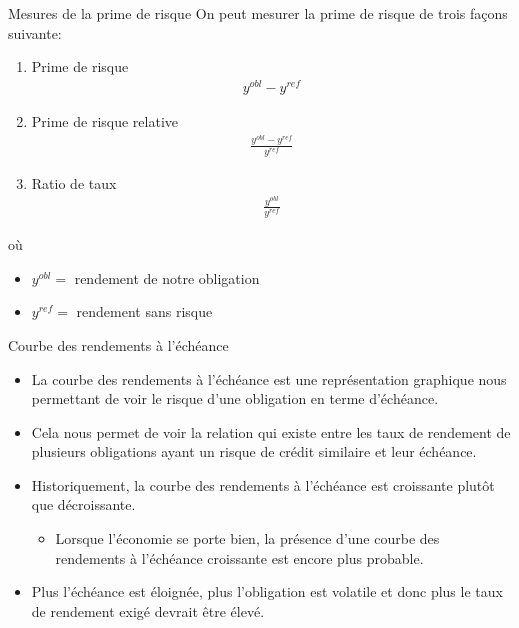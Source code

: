 \documentclass{beamer}
\begin{document}
\begin{frame}{Mesures de la prime de risque}
On peut mesurer la prime de risque de trois façons suivante:
\begin{enumerate}
\item Prime de risque 
\begin{align*}
y^{obl}-y^{ref}
\end{align*}
\item Prime de risque relative
\begin{align*}
\frac{y^{obl}-y^{ref}}{y^{ref}}
\end{align*}
\item Ratio de taux
\begin{align*}
\frac{y^{obl}}{y^{ref}}
\end{align*}
\end{enumerate}
où 
\begin{itemize}
\item $y^{obl}=$ rendement de notre obligation
\item $y^{ref}=$ rendement sans risque
\end{itemize}
\end{frame}

\begin{frame}{Courbe des rendements à l’échéance}
\begin{itemize}
\item La courbe des rendements à l'échéance est une représentation graphique nous permettant de voir le risque d'une obligation en terme d'échéance.
\item Cela nous permet de voir la relation qui existe entre les taux de rendement de plusieurs obligations ayant un risque de crédit similaire et leur échéance.  
\item Historiquement,  la courbe des rendements à l’échéance est croissante plutôt que décroissante.
\begin{itemize}
\item Lorsque l'économie se porte bien,  la présence d'une courbe des rendements à l’échéance croissante est encore plus probable. 
\end{itemize}
\item Plus l’échéance est éloignée,  plus l’obligation est volatile et donc plus le taux de rendement exigé devrait être élevé.  
\end{itemize}
\end{frame}
\end{document}
